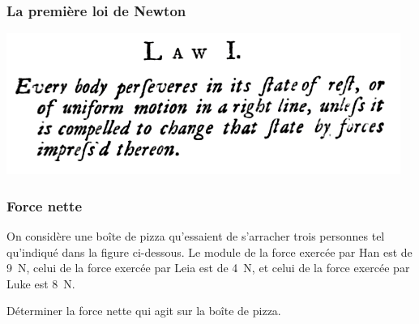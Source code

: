 \documentclass{beamer}
\begin{document}
\begin{frame}
  \frametitle{La première loi de Newton}
  \includegraphics[scale=0.6]{newton1stlaw.png}
\end{frame}


\begin{frame}
  \frametitle{Force nette}

  On considère une boîte de pizza qu'essaient de s'arracher trois personnes tel
  qu'indiqué dans la figure ci-dessous.  Le module de la force exercée par Han
  est de \SI{9}{\newton}, celui de la force exercée par Leia est de
  \SI{4}{\newton}, et celui de la force exercée par Luke est \SI{8}{\newton}.

  Déterminer la force nette qui agit sur la boîte de pizza.


\end{frame}
\end{document}
